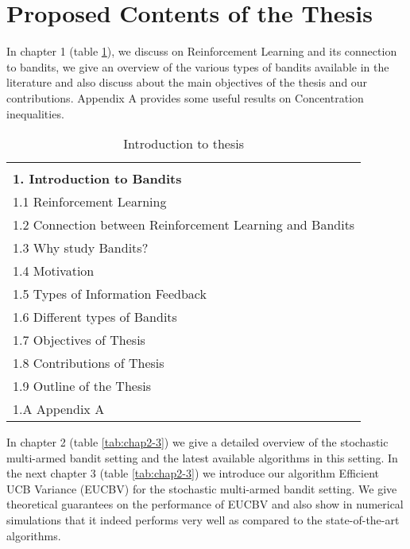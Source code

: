 \documentclass[MS,synopsis]{iitmdiss}
\begin{document}

\section{Proposed Contents of the Thesis}

In chapter 1 (table \ref{tab:chap1}), we discuss on Reinforcement Learning and its connection to bandits, we give an overview of the various types of bandits available in the literature and also discuss about the main objectives of the thesis and our contributions. Appendix A provides some useful results on Concentration inequalities. 


\begin{table}[!th]
\begin{center}
\begin{tabular}{|p{26em}|}
\hline\\
\textbf{1. Introduction to Bandits} \\\hline
1.1 Reinforcement Learning \\
1.2 Connection between Reinforcement Learning and Bandits \\
1.3 Why study Bandits?\\
1.4 Motivation \\
1.5 Types of Information Feedback\\
1.6 Different types of Bandits\\
1.7 Objectives of Thesis\\
1.8 Contributions of Thesis\\
1.9 Outline of the Thesis\\
1.A Appendix A\\
\hline
\end{tabular}
\end{center}
\caption{Introduction to thesis}
\label{tab:chap1}
\end{table}


In chapter 2 (table \ref{tab:chap2-3}) we give a detailed overview of the stochastic multi-armed bandit setting and the latest available algorithms in this setting. In the next chapter 3 (table \ref{tab:chap2-3}) we introduce our algorithm Efficient UCB Variance (EUCBV) for the stochastic multi-armed bandit setting. We give theoretical guarantees on the performance of EUCBV and also show in numerical simulations that it indeed performs very well as compared to the state-of-the-art algorithms. 
\end{document}
